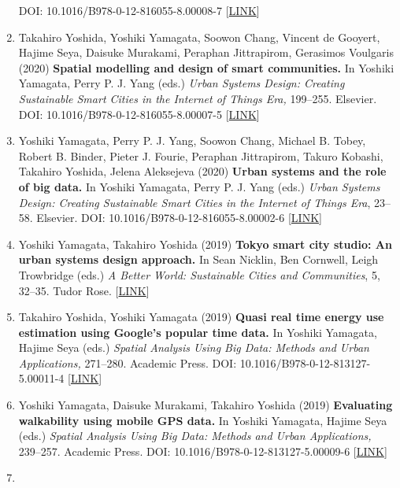 \documentclass[]{book}
\begin{document}
\begin{enumerate}
  DOI: 10.1016/B978-0-12-816055-8.00008-7 {[}\href{https://www.elsevier.com/books/urban-systems-design/yamagata/978-0-12-816055-8}{LINK}{]}
\item
  Takahiro Yoshida, Yoshiki Yamagata, Soowon Chang, Vincent de Gooyert, Hajime Seya, Daisuke Murakami, Peraphan Jittrapirom, Gerasimos Voulgaris (2020)
  \textbf{Spatial modelling and design of smart communities.}
  In Yoshiki Yamagata, Perry P. J. Yang (eds.)
  \emph{Urban Systems Design: Creating Sustainable Smart Cities in the Internet of Things Era,} 199--255. Elsevier.
  DOI: 10.1016/B978-0-12-816055-8.00007-5 {[}\href{https://www.elsevier.com/books/urban-systems-design/yamagata/978-0-12-816055-8}{LINK}{]}
\item
  Yoshiki Yamagata, Perry P. J. Yang, Soowon Chang, Michael B. Tobey, Robert B. Binder, Pieter J. Fourie, Peraphan Jittrapirom, Takuro Kobashi, Takahiro Yoshida, Jelena Aleksejeva (2020)
  \textbf{Urban systems and the role of big data.}
  In Yoshiki Yamagata, Perry P. J. Yang (eds.)
  \emph{Urban Systems Design: Creating Sustainable Smart Cities in the Internet of Things Era}, 23--58. Elsevier.
  DOI: 10.1016/B978-0-12-816055-8.00002-6 {[}\href{https://www.elsevier.com/books/urban-systems-design/yamagata/978-0-12-816055-8}{LINK}{]}
\item
  Yoshiki Yamagata, Takahiro Yoshida (2019)
  \textbf{Tokyo smart city studio: An urban systems design approach.}
  In Sean Nicklin, Ben Cornwell, Leigh Trowbridge (eds.)
  \emph{A Better World: Sustainable Cities and Communities}, 5, 32--35. Tudor Rose.
  {[}\href{http://unhabitat.org.mm/publications/a-better-world-volume-5/}{LINK}{]}
\item
  Takahiro Yoshida, Yoshiki Yamagata (2019)
  \textbf{Quasi real time energy use estimation using Google's popular time data.}
  In Yoshiki Yamagata, Hajime Seya (eds.)
  \emph{Spatial Analysis Using Big Data: Methods and Urban Applications,} 271--280. Academic Press.
  DOI: 10.1016/B978-0-12-813127-5.00011-4 {[}\href{https://www.elsevier.com/books/spatial-analysis-using-big-data/yamagata/978-0-12-813127-5}{LINK}{]}
\item
  Yoshiki Yamagata, Daisuke Murakami, Takahiro Yoshida (2019)
  \textbf{Evaluating walkability using mobile GPS data.}
  In Yoshiki Yamagata, Hajime Seya (eds.)
  \emph{Spatial Analysis Using Big Data: Methods and Urban Applications,} 239--257. Academic Press.
  DOI: 10.1016/B978-0-12-813127-5.00009-6 {[}\href{https://www.elsevier.com/books/spatial-analysis-using-big-data/yamagata/978-0-12-813127-5}{LINK}{]}
\item

\end{enumerate}
\end{document}
